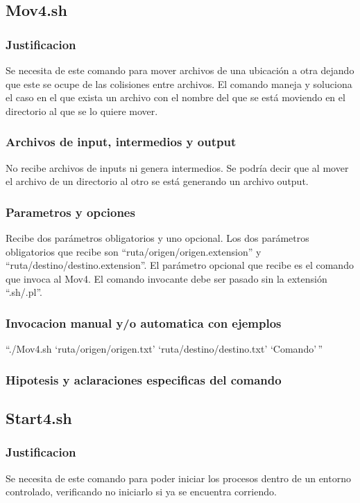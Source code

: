 \documentclass{article}
\begin{document}
	\subsection{Mov4.sh}
	
		\subsubsection{Justificacion}
		Se necesita de este comando para mover archivos de una ubicación a otra dejando que este se ocupe de las colisiones entre archivos. El comando maneja y soluciona el caso en el que exista un archivo con el nombre del que se está moviendo en el directorio al que se lo quiere mover.
		\subsubsection{Archivos de input, intermedios y output}
		No recibe archivos de inputs ni genera intermedios. Se podría decir que al mover el archivo de un directorio al otro se está generando un archivo output.
		\subsubsection{Parametros y opciones}
		Recibe dos parámetros obligatorios y uno opcional. Los dos parámetros obligatorios que recibe son ``ruta/origen/origen.extension'' y ``ruta/destino/destino.extension''. El parámetro opcional que recibe es el comando que invoca al Mov4. El comando invocante debe ser pasado sin la extensión ``.sh/.pl''.
		\subsubsection{Invocacion manual y/o automatica con ejemplos}
		``./Mov4.sh `ruta/origen/origen.txt' `ruta/destino/destino.txt' `Comando'\,''
		\subsubsection{Hipotesis y aclaraciones especificas del comando}
	
	\subsection{Start4.sh}
	
		\subsubsection{Justificacion}
		Se necesita de este comando para poder iniciar los procesos dentro de un entorno controlado, verificando no iniciarlo si ya se encuentra corriendo.
\end{document}
